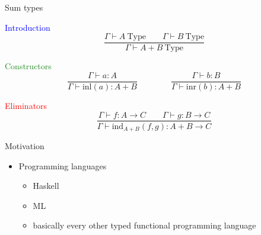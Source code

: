 \documentclass[usenames,dvipsnames]{beamer}
\newcommand{\blu}[1]{\textcolor{blue}{#1}}
\newcommand{\gre}[1]{\textcolor{ForestGreen}{#1}}
\newcommand{\red}[1]{\textcolor{red}{#1}}
\begin{document}
    \begin{frame}{Sum types}
        \begin{block}{\blu{Introduction}}
            $$\frac{\Gamma \vdash A\ \text{Type}\qquad \Gamma \vdash B\ \text{Type} }{\Gamma \vdash A + B\ \text{Type}}$$
        \end{block}
        
        \begin{block}{\gre{Constructors}}
            $$\frac{\Gamma \vdash a : A}{\Gamma \vdash \text{inl}(a) : A + B} \qquad\qquad
              \frac{\Gamma \vdash b : B}{\Gamma \vdash \text{inr}(b) : A + B}$$
        \end{block}
        
        \begin{block}{\red{Eliminators}}
            $$\frac
                {\Gamma \vdash f : A \to C \qquad \Gamma \vdash g : B \to C}
                {\Gamma \vdash \text{ind}_{A+B}(f, g) : A + B \to C}$$
        \end{block}
        
    \end{frame}
    
    \begin{frame}{Motivation}
        \begin{itemize}
            \item Programming languages
            \begin{itemize}
                \item Haskell
                \item ML
                \item basically every other typed functional programming language
            \end{itemize}
        \end{itemize}
    \end{frame}
    
\end{document}
